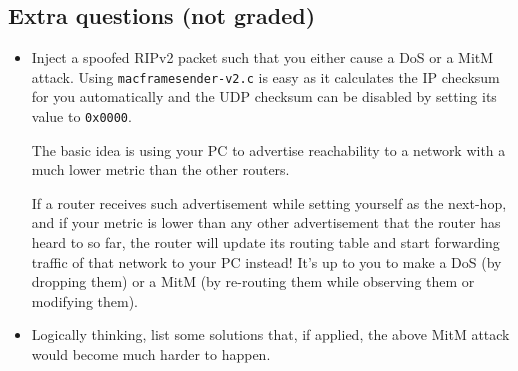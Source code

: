 \documentclass[pdftex,12pt,a4paper]{article}
\begin{document}
        \subsection{Extra questions (not graded)}
            \begin{itemize}
                \item Inject a spoofed RIPv2 packet such that  you either cause a
                    DoS or a MitM attack. Using \texttt{macframesender-v2.c} is
                    easy as it calculates the IP checksum for you automatically
                    and the UDP checksum can be disabled by setting its value
                    to \texttt{0x0000}.

                    The basic idea is using your PC to advertise reachability
                    to a network with a much lower metric than the other
                    routers.

                    If a router receives such advertisement while setting
                    yourself as the next-hop, and if your metric is lower than
                    any other advertisement that the router has heard to so
                    far, the router will update its routing table and start
                    forwarding traffic of that network to your PC instead!
                    It's up to you to make a DoS (by dropping them) or a MitM
                    (by re-routing them while observing them or modifying
                    them).

                \item Logically thinking, list some solutions that, if applied,
                    the above MitM attack would become much harder to happen.
            \end{itemize}
    \appendix
\end{document}
